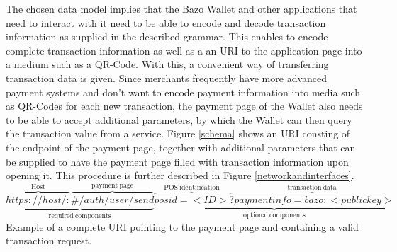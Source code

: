 The chosen data model implies that the Bazo Wallet and other applications that need to interact with it need to be able to encode and decode transaction information as supplied in the described grammar.
This enables to encode complete transaction information as well as a an URI to the application page into a medium such as a QR-Code. With this, a convenient way of transferring transaction data is given.
Since merchants frequently have more advanced payment systems and don't want to encode payment information into media such as QR-Codes for each new transaction, the payment page of the Wallet also needs to be able to accept additional parameters, by which the Wallet can then query the transaction value from a service.
Figure \ref{schema} shows an URI consting of the endpoint of the payment page, together with additional parameters that can be supplied to have the payment page filled with transaction information upon opening it. This procedure is further described in Figure \ref{networkandinterfaces}.
\[
\underbrace{\overbrace{https://host/:}^{\mathrm{Host}}\overbrace{\#/auth/user/send}^{\mathrm{payment\ page}}}_{\mathrm{required\ components}}
\underbrace{\overbrace{posid=<ID>}^{\mathrm{POS\  identification}}\overbrace{?paymentinfo=bazo:<public key>}^{\mathrm{transaction\ data}}}_{\mathrm{optional\ components}}
\]\label{fig:schema}Example of a complete URI pointing to the payment page and containing a valid transaction request.


